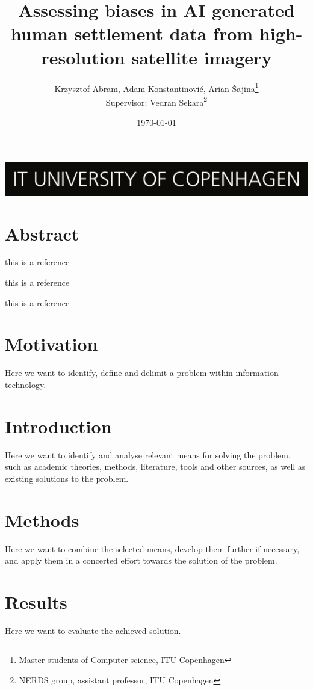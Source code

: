 \documentclass[11pt]{article}
\title{Assessing biases in AI generated human settlement data from high-resolution satellite imagery}
\author{Krzysztof Abram, Adam Konstantinovi\'{c}, Arian \v{S}ajina\thanks{Master students of Computer science, ITU Copenhagen} \\
        Supervisor: Vedran Sekara\thanks{NERDS group, assistant professor, ITU Copenhagen}}
\date{\today}
\begin{document}
    \maketitle
    \vfill
    \includegraphics[width=\textwidth]{itu_logo.jpg}
    \newpage

    \section*{Abstract}
        \lipsum[1-1]

    this is a reference \cite[see][figure 3]{FB-paper}

    this is a reference \cite{HRSL-dataset}

    this is a reference \cite{grid3-dataset}

    \section{Motivation}
    Here we want to identify, define and delimit a problem within information technology.

    \lipsum[1-1]

    \section{Introduction}
    Here we want to identify and analyse relevant means for solving the problem, such as academic theories, methods, literature, tools and other sources, as well as existing solutions to the problem.

    \lipsum[1-1]

    \section{Methods}
    Here we want to combine the selected means, develop them further if necessary, and apply them in a concerted effort towards the solution of the problem.

    \lipsum[1-1]

    \section{Results}
    Here we want to evaluate the achieved solution.
\end{document}
